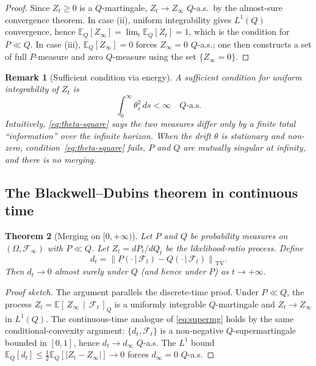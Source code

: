 \documentclass[12pt]{article}
\newtheorem{theorem}{Theorem}[section]
\newtheorem{remark}[theorem]{Remark}
\newcommand{\E}{\mathbb{E}}
\newcommand{\Ec}[2]{\mathbb{E}\!\left[\,#1\,\middle|\,#2\,\right]}
\newcommand{\TV}[1]{\left\|#1\right\|_{\mathrm{TV}}}
\begin{document}
\begin{proof}
Since $Z_t \geq 0$ is a $Q$-martingale, $Z_t \to Z_\infty$ $Q$-a.s.\ by
the almost-sure convergence theorem.  In case (ii), uniform integrability
gives $L^1(Q)$ convergence, hence $\E_Q[Z_\infty] = \lim_t \E_Q[Z_t] = 1$,
which is the condition for $P \ll Q$.  In case (iii), $\E_Q[Z_\infty] = 0$
forces $Z_\infty = 0$ $Q$-a.s.; one then constructs a set of full $P$-measure
and zero $Q$-measure using the set $\{Z_\infty = 0\}$.
\end{proof}

\begin{remark}[Sufficient condition via energy]
A sufficient condition for uniform integrability of $Z_t$ is
\begin{equation}
\label{eq:theta-square}
\int_0^\infty \theta_s^2\, ds < \infty \quad Q\text{-a.s.}
\end{equation}
Intuitively, \eqref{eq:theta-square} says the two measures differ only by a
finite total ``information'' over the infinite horizon.  When the drift
$\theta$ is stationary and non-zero, condition~\eqref{eq:theta-square}
fails, $P$ and $Q$ are mutually singular at infinity, and there is no
merging.
\end{remark}

\subsection{The Blackwell--Dubins theorem in continuous time}

\begin{theorem}[Merging on $[0, +\infty)$]
\label{thm:BD-CT}
Let $P$ and $Q$ be probability measures on $(\Omega, \mathscr{F}_\infty)$
with $P \ll Q$.  Let $Z_t = dP_t/dQ_t$ be the likelihood-ratio process.
Define
\[
d_t = \TV{P(\cdot\,|\,\mathscr{F}_t) - Q(\cdot\,|\,\mathscr{F}_t)}.
\]
Then $d_t \to 0$ almost surely under $Q$ (and hence under $P$) as
$t \to +\infty$.
\end{theorem}

\begin{proof}[Proof sketch]
The argument parallels the discrete-time proof.  Under $P \ll Q$, the
process $Z_t = \Ec{Z_\infty}{\mathscr{F}_t}_Q$ is a uniformly integrable
$Q$-martingale and $Z_t \to Z_\infty$ in $L^1(Q)$.  The continuous-time
analogue of \eqref{eq:supermg} holds by the same conditional-convexity
argument: $\{d_t, \mathscr{F}_t\}$ is a non-negative $Q$-supermartingale
bounded in $[0,1]$, hence $d_t \to d_\infty$ $Q$-a.s.  The $L^1$ bound
$\E_Q[d_t] \leq \tfrac{1}{2}\E_Q[|Z_t - Z_\infty|] \to 0$
forces $d_\infty = 0$ $Q$-a.s.
\end{proof}
\end{document}
